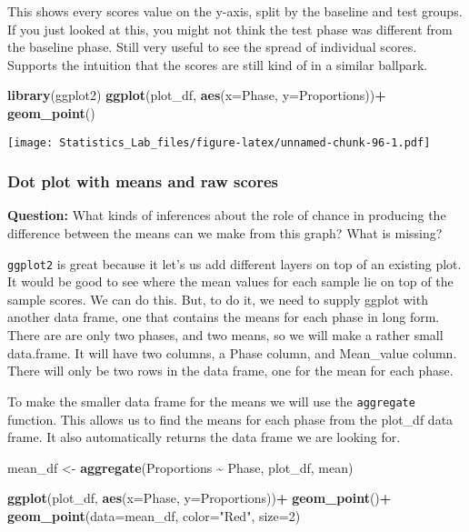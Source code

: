 \documentclass[
]{book}
\newenvironment{Shaded}{\begin{snugshade}}{\end{snugshade}}
\newcommand{\AttributeTok}[1]{\textcolor[rgb]{0.13,0.29,0.53}{#1}}
\newcommand{\DecValTok}[1]{\textcolor[rgb]{0.00,0.00,0.81}{#1}}
\newcommand{\FunctionTok}[1]{\textcolor[rgb]{0.13,0.29,0.53}{\textbf{#1}}}
\newcommand{\NormalTok}[1]{#1}
\newcommand{\OtherTok}[1]{\textcolor[rgb]{0.56,0.35,0.01}{#1}}
\newcommand{\SpecialCharTok}[1]{\textcolor[rgb]{0.81,0.36,0.00}{\textbf{#1}}}
\newcommand{\StringTok}[1]{\textcolor[rgb]{0.31,0.60,0.02}{#1}}
\begin{document}
This shows every scores value on the y-axis, split by the baseline and test groups. If you just looked at this, you might not think the test phase was different from the baseline phase. Still very useful to see the spread of individual scores. Supports the intuition that the scores are still kind of in a similar ballpark.

\begin{Shaded}
\begin{Highlighting}[]
\FunctionTok{library}\NormalTok{(ggplot2)}
\FunctionTok{ggplot}\NormalTok{(plot\_df, }\FunctionTok{aes}\NormalTok{(}\AttributeTok{x=}\NormalTok{Phase, }\AttributeTok{y=}\NormalTok{Proportions))}\SpecialCharTok{+}
  \FunctionTok{geom\_point}\NormalTok{()}
\end{Highlighting}
\end{Shaded}

\texttt{[image: Statistics\_Lab\_files/figure-latex/unnamed-chunk-96-1.pdf]}

\hypertarget{dot-plot-with-means-and-raw-scores}{%
\subsubsection{Dot plot with means and raw scores}\label{dot-plot-with-means-and-raw-scores}}

\textbf{Question:} What kinds of inferences about the role of chance in producing the difference between the means can we make from this graph? What is missing?

\texttt{ggplot2} is great because it let's us add different layers on top of an existing plot. It would be good to see where the mean values for each sample lie on top of the sample scores. We can do this. But, to do it, we need to supply ggplot with another data frame, one that contains the means for each phase in long form. There are are only two phases, and two means, so we will make a rather small data.frame. It will have two columns, a Phase column, and Mean\_value column. There will only be two rows in the data frame, one for the mean for each phase.

To make the smaller data frame for the means we will use the \texttt{aggregate} function. This allows us to find the means for each phase from the plot\_df data frame. It also automatically returns the data frame we are looking for.

\begin{Shaded}
\begin{Highlighting}[]
\NormalTok{mean\_df }\OtherTok{\textless{}{-}} \FunctionTok{aggregate}\NormalTok{(Proportions }\SpecialCharTok{\textasciitilde{}}\NormalTok{ Phase, plot\_df, mean)}

\FunctionTok{ggplot}\NormalTok{(plot\_df, }\FunctionTok{aes}\NormalTok{(}\AttributeTok{x=}\NormalTok{Phase, }\AttributeTok{y=}\NormalTok{Proportions))}\SpecialCharTok{+} 
  \FunctionTok{geom\_point}\NormalTok{()}\SpecialCharTok{+}
  \FunctionTok{geom\_point}\NormalTok{(}\AttributeTok{data=}\NormalTok{mean\_df, }\AttributeTok{color=}\StringTok{"Red"}\NormalTok{, }\AttributeTok{size=}\DecValTok{2}\NormalTok{)}
\end{Highlighting}
\end{Shaded}
\end{document}
